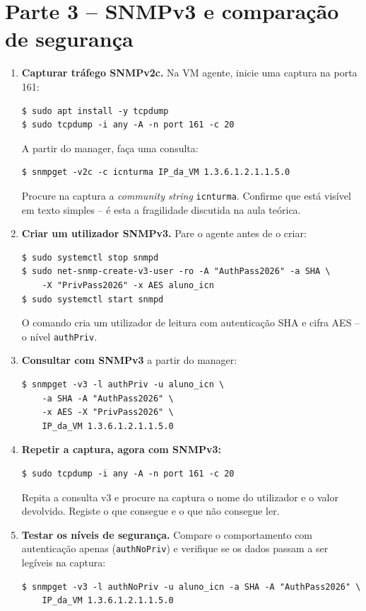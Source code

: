 \documentclass[11pt,a4paper]{article}
\begin{document}
\section{Parte 3 -- SNMPv3 e comparação de segurança}
\begin{enumerate}[label=\arabic*.]

  \item \textbf{Capturar tráfego SNMPv2c.} Na VM agente, inicie uma captura na porta 161:
\begin{lstlisting}
$ sudo apt install -y tcpdump
$ sudo tcpdump -i any -A -n port 161 -c 20
\end{lstlisting}
  A partir do manager, faça uma consulta:
\begin{lstlisting}
$ snmpget -v2c -c icnturma IP_da_VM 1.3.6.1.2.1.1.5.0
\end{lstlisting}
  Procure na captura a \textit{community string} \texttt{icnturma}. Confirme que está visível em texto simples -- é esta a fragilidade discutida na aula teórica.

  \item \textbf{Criar um utilizador SNMPv3.} Pare o agente antes de o criar:
\begin{lstlisting}
$ sudo systemctl stop snmpd
$ sudo net-snmp-create-v3-user -ro -A "AuthPass2026" -a SHA \
    -X "PrivPass2026" -x AES aluno_icn
$ sudo systemctl start snmpd
\end{lstlisting}
  O comando cria um utilizador de leitura com autenticação SHA e cifra AES -- o nível \texttt{authPriv}.

  \item \textbf{Consultar com SNMPv3} a partir do manager:
\begin{lstlisting}
$ snmpget -v3 -l authPriv -u aluno_icn \
    -a SHA -A "AuthPass2026" \
    -x AES -X "PrivPass2026" \
    IP_da_VM 1.3.6.1.2.1.1.5.0
\end{lstlisting}

  \item \textbf{Repetir a captura, agora com SNMPv3:}
\begin{lstlisting}
$ sudo tcpdump -i any -A -n port 161 -c 20
\end{lstlisting}
  Repita a consulta v3 e procure na captura o nome do utilizador e o valor devolvido. Registe o que consegue e o que não consegue ler.

  \item \textbf{Testar os níveis de segurança.} Compare o comportamento com autenticação apenas (\texttt{authNoPriv}) e verifique se os dados passam a ser legíveis na captura:
\begin{lstlisting}
$ snmpget -v3 -l authNoPriv -u aluno_icn -a SHA -A "AuthPass2026" \
    IP_da_VM 1.3.6.1.2.1.1.5.0
\end{lstlisting}


\end{enumerate}
\end{document}
